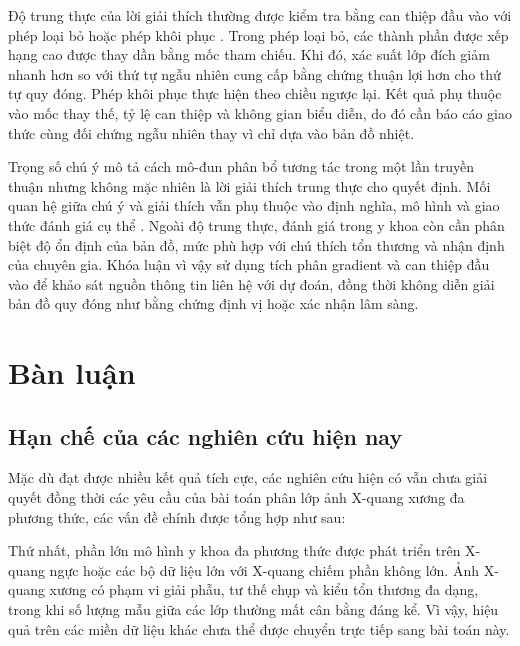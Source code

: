 Độ trung thực của lời giải thích thường được kiểm tra bằng can thiệp đầu vào với phép loại bỏ hoặc phép khôi phục \cite{Petsiuk2018RISE}. Trong phép loại bỏ, các thành phần được xếp hạng cao được thay dần bằng mốc tham chiếu. Khi đó, xác suất lớp đích giảm nhanh hơn so với thứ tự ngẫu nhiên cung cấp bằng chứng thuận lợi hơn cho thứ tự quy đóng. Phép khôi phục thực hiện theo chiều ngược lại. Kết quả phụ thuộc vào mốc thay thế, tỷ lệ can thiệp và không gian biểu diễn, do đó cần báo cáo giao thức cùng đối chứng ngẫu nhiên thay vì chỉ dựa vào bản đồ nhiệt.

Trọng số chú ý mô tả cách mô-đun phân bổ tương tác trong một lần truyền thuận nhưng không mặc nhiên là lời giải thích trung thực cho quyết định. Mối quan hệ giữa chú ý và giải thích vẫn phụ thuộc vào định nghĩa, mô hình và giao thức đánh giá cụ thể \cite{Jain2019AttentionNotExplanation,Wiegreffe2019AttentionNotNotExplanation}. Ngoài độ trung thực, đánh giá trong y khoa còn cần phân biệt độ ổn định của bản đồ, mức phù hợp với chú thích tổn thương và nhận định của chuyên gia. Khóa luận vì vậy sử dụng tích phân gradient và can thiệp đầu vào để khảo sát nguồn thông tin liên hệ với dự đoán, đồng thời không diễn giải bản đồ quy đóng như bằng chứng định vị hoặc xác nhận lâm sàng.

\pagebreak

\section{Bàn luận}

\subsection{Hạn chế của các nghiên cứu hiện nay}

Mặc dù đạt được nhiều kết quả tích cực, các nghiên cứu hiện có vẫn chưa giải quyết đồng thời các yêu cầu của bài toán phân lớp ảnh X-quang xương đa phương thức, các vấn đề chính được tổng hợp như sau:

Thứ nhất, phần lớn mô hình y khoa đa phương thức được phát triển trên X-quang ngực hoặc các bộ dữ liệu lớn với X-quang chiếm phần không lớn. Ảnh X-quang xương có phạm vi giải phẫu, tư thế chụp và kiểu tổn thương đa dạng, trong khi số lượng mẫu giữa các lớp thường mất cân bằng đáng kể. Vì vậy, hiệu quả trên các miền dữ liệu khác chưa thể được chuyển trực tiếp sang bài toán này.

